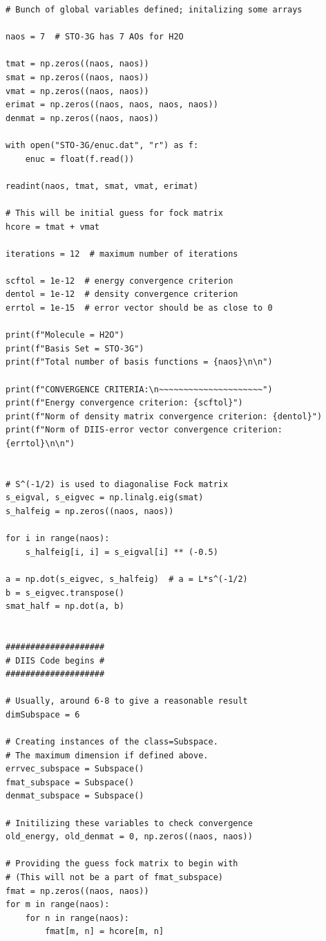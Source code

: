 \begin{lstlisting}[style=MyPython]
# Bunch of global variables defined; initalizing some arrays

naos = 7  # STO-3G has 7 AOs for H2O

tmat = np.zeros((naos, naos))
smat = np.zeros((naos, naos))
vmat = np.zeros((naos, naos))
erimat = np.zeros((naos, naos, naos, naos))
denmat = np.zeros((naos, naos))

with open("STO-3G/enuc.dat", "r") as f:
    enuc = float(f.read())

readint(naos, tmat, smat, vmat, erimat)

# This will be initial guess for fock matrix
hcore = tmat + vmat

iterations = 12  # maximum number of iterations

scftol = 1e-12  # energy convergence criterion
dentol = 1e-12  # density convergence criterion
errtol = 1e-15  # error vector should be as close to 0

print(f"Molecule = H2O")
print(f"Basis Set = STO-3G")
print(f"Total number of basis functions = {naos}\n\n")

print(f"CONVERGENCE CRITERIA:\n~~~~~~~~~~~~~~~~~~~~~")
print(f"Energy convergence criterion: {scftol}")
print(f"Norm of density matrix convergence criterion: {dentol}")
print(f"Norm of DIIS-error vector convergence criterion: {errtol}\n\n")


# S^(-1/2) is used to diagonalise Fock matrix
s_eigval, s_eigvec = np.linalg.eig(smat)
s_halfeig = np.zeros((naos, naos))

for i in range(naos):
    s_halfeig[i, i] = s_eigval[i] ** (-0.5)

a = np.dot(s_eigvec, s_halfeig)  # a = L*s^(-1/2)
b = s_eigvec.transpose()
smat_half = np.dot(a, b)


####################
# DIIS Code begins #
####################

# Usually, around 6-8 to give a reasonable result
dimSubspace = 6

# Creating instances of the class=Subspace.
# The maximum dimension if defined above.
errvec_subspace = Subspace()
fmat_subspace = Subspace()
denmat_subspace = Subspace()

# Initilizing these variables to check convergence
old_energy, old_denmat = 0, np.zeros((naos, naos))

# Providing the guess fock matrix to begin with
# (This will not be a part of fmat_subspace)
fmat = np.zeros((naos, naos))
for m in range(naos):
    for n in range(naos):
        fmat[m, n] = hcore[m, n]


\end{lstlisting}
